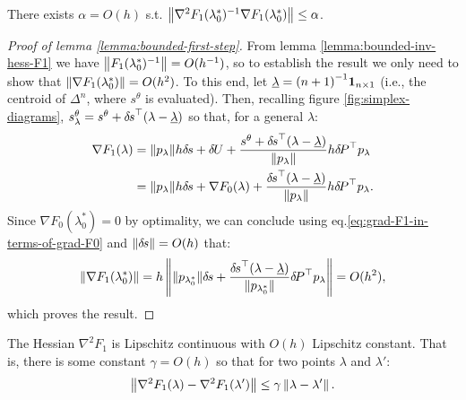 \documentclass[smallcondensed]{svjour3}
\begin{document}
\begin{lemma}\label{lemma:bounded-first-step}
  There exists $\alpha = O(h)$ s.t.
  $\left\|\nabla^2 F_1(\lambda_{0}^*)^{-1} \nabla F_1(\lambda_{0}^*)\right\|
  \leq \alpha$.
\end{lemma}

\begin{proof}[Proof of lemma \ref{lemma:bounded-first-step}]
  From lemma \ref{lemma:bounded-inv-hess-F1} we have
  $\left\|F_1(\lambda_0^*)^{-1}\right\| = O(h^{-1})$, so to establish the
  result we only need to show that
  $\left\|\nabla F_1(\lambda_0^*)\right\| = O(h^2)$. To this end, let
  $\underline{\lambda} = {(n + 1)}^{-1} \boldsymbol{1}_{n \times 1}$ (i.e., the
  centroid of $\Delta^n$, where $s^\theta$ is evaluated). Then,
  recalling figure \ref{fig:simplex-diagrams},
  $s^\theta_\lambda = s^\theta + {\delta \hspace{-0.1em} s}^\top (\lambda -
  \underline{\lambda})$ so that, for a general $\lambda$:
  \begin{equation}\label{eq:grad-F1-in-terms-of-grad-F0}
    \begin{aligned}
      \nabla F_1(\lambda) &= \|p_\lambda\| h {\delta \hspace{-0.1em} s} + {\delta \hspace{-0.09em} U} + \frac{s^\theta + {\delta \hspace{-0.1em} s}^\top (\lambda - \underline{\lambda})}{\|p_\lambda\|} h {\delta \hspace{-0.14em} P}^\top p_\lambda \\
      &= \|p_\lambda\| h {\delta \hspace{-0.1em} s} + \nabla F_0(\lambda) + \frac{{\delta \hspace{-0.1em} s}^\top {(\lambda - \underline{\lambda})}}{\|p_\lambda\|} h {\delta \hspace{-0.14em} P}^\top p_\lambda.
    \end{aligned}
  \end{equation}
  Since $\nabla F_0(\lambda_0^*) = 0$ by optimality, we can conclude
  using eq.\@ \ref{eq:grad-F1-in-terms-of-grad-F0} and
  $\left\|{\delta \hspace{-0.1em} s}\right\| = O(h)$ that:
  \begin{equation}
    \left\|\nabla F_1(\lambda_0^*)\right\| = h \left\|\|p_{\lambda_0^*}\| {\delta \hspace{-0.1em} s} + \frac{{\delta \hspace{-0.1em} s}^\top {(\lambda - \underline{\lambda})}}{\|p_{\lambda_0^*}\|} {\delta \hspace{-0.14em} P}^\top p_\lambda\right\| = O(h^2),
  \end{equation}
  which proves the result.
\end{proof}

\begin{lemma}\label{lemma:hess-F1-lipschitz}
  The Hessian $\nabla^2 F_1$ is Lipschitz continuous with $O(h)$
  Lipschitz constant. That is, there is some constant $\gamma = O(h)$
  so that for two points $\lambda$ and $\lambda'$:
  \begin{align*}
    \left\|\nabla^2 F_1(\lambda) - \nabla^2 F_1(\lambda')\right\| \leq \gamma \left\|\lambda - \lambda'\right\|.
  \end{align*}
\end{lemma}
\end{document}
